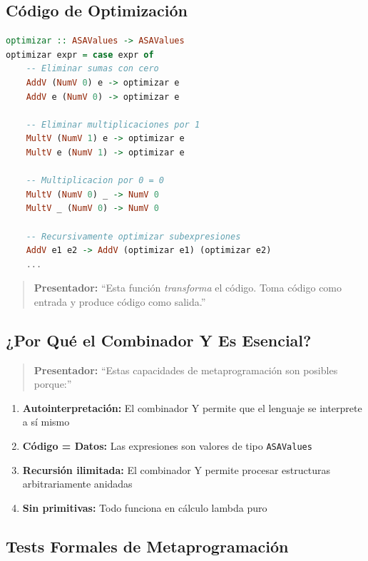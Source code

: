 \documentclass[12pt]{article}
\begin{document}
\subsection*{Código de Optimización}

\begin{lstlisting}[language=Haskell, caption=Transformación de código]
optimizar :: ASAValues -> ASAValues
optimizar expr = case expr of
    -- Eliminar sumas con cero
    AddV (NumV 0) e -> optimizar e
    AddV e (NumV 0) -> optimizar e

    -- Eliminar multiplicaciones por 1
    MultV (NumV 1) e -> optimizar e
    MultV e (NumV 1) -> optimizar e

    -- Multiplicacion por 0 = 0
    MultV (NumV 0) _ -> NumV 0
    MultV _ (NumV 0) -> NumV 0

    -- Recursivamente optimizar subexpresiones
    AddV e1 e2 -> AddV (optimizar e1) (optimizar e2)
    ...
\end{lstlisting}

\begin{quote}
\textbf{Presentador:} ``Esta función \textit{transforma} el código. Toma código como entrada y produce código como salida.''
\end{quote}

\subsection*{¿Por Qué el Combinador Y Es Esencial?}

\begin{quote}
\textbf{Presentador:} ``Estas capacidades de metaprogramación son posibles porque:''
\end{quote}

\begin{enumerate}
\item \textbf{Autointerpretación:} El combinador Y permite que el lenguaje se interprete a sí mismo
\item \textbf{Código = Datos:} Las expresiones son valores de tipo \texttt{ASAValues}
\item \textbf{Recursión ilimitada:} El combinador Y permite procesar estructuras arbitrariamente anidadas
\item \textbf{Sin primitivas:} Todo funciona en cálculo lambda puro
\end{enumerate}

\newpage
\subsection*{Tests Formales de Metaprogramación}
\end{document}
